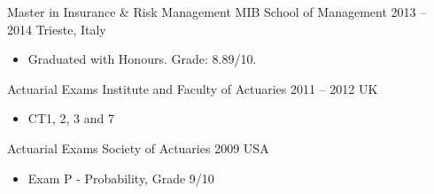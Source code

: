 \documentclass[a4paper,]{fortysecondscv}
\begin{document}



\begin{cvtable}%
    \vspace{\topsep}
    \cvitemoneblock
    {Master in Insurance \& Risk Management}
    {MIB School of Management}
    {2013 -- 2014}
    {Trieste, Italy}
    {
        \begin{itemize}[nosep, leftmargin=12pt, label={-}] %
            \item Graduated with Honours. Grade: 8.89/10.
        \end{itemize}
    }
    \vspace{\topsep}
    \cvitemoneblock
    {Actuarial Exams}
    {Institute and Faculty of Actuaries}
    {2011 -- 2012}
    {UK}
    {
        \begin{itemize}[nosep, leftmargin=12pt, label={-}]
            \item CT1, 2, 3 and 7
        \end{itemize}
    }


    \vspace{\topsep}
    \cvitemoneblock
    {Actuarial Exams}
    {Society of Actuaries}
    {2009}
    {USA}
    {
        \vspace{-\topsep}
        \begin{itemize}[nosep, leftmargin=12pt, label={-}]
            \item Exam P - Probability, Grade 9/10
        \end{itemize}
    }
\end{cvtable}
\end{document}
